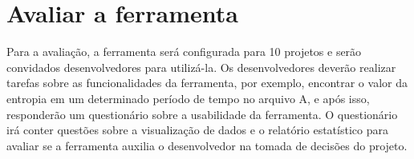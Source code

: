 \section{Avaliar a ferramenta}
Para a avaliação, a ferramenta será configurada para 10 projetos e serão convidados desenvolvedores para utilizá-la. Os desenvolvedores deverão realizar tarefas sobre as funcionalidades da ferramenta, por exemplo, encontrar o valor da entropia em um determinado período de tempo no arquivo A, e após isso, responderão um questionário sobre a usabilidade da ferramenta. O questionário irá conter questões sobre a visualização de dados e o relatório estatístico para avaliar se a ferramenta auxilia o desenvolvedor na tomada de decisões do projeto.